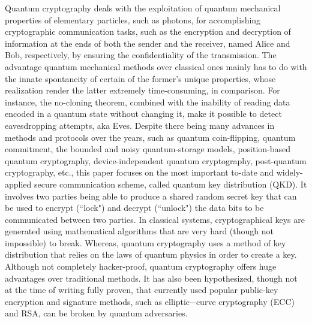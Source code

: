 Quantum cryptography deals with the exploitation of quantum mechanical properties of elementary particles, 
such as photons, for accomplishing cryptographic communication tasks, such as the encryption and decryption of 
information at the ends of both the sender and the receiver, named Alice and Bob, respectively, by ensuring the
confidentiality of the transmission.
The advantage quantum mechanical methods over classical ones mainly has to do with the innate spontaneity of certain 
of the former's unique properties, whose realization render the latter extremely time-consuming, in comparison. 
For instance, the no-cloning theorem, combined with the inability of reading data encoded in a quantum state
without changing it, make it possible to detect eavesdropping attempts, aka Eves.
Despite there being many advances in methods and protocols over the years, such as quantum coin-flipping, 
quantum commitment, the bounded and noisy quantum-storage models, position-based quantum cryptography, device-independent quantum
cryptography, post-quantum cryptography, etc., this paper focuses on the most important to-date and widely-applied secure 
communication scheme, called quantum key distribution (QKD). It involves two parties being able to produce a shared random secret
key that can be used to encrypt (``lock") and decrypt (``unlock") the data bits to be communicated between two parties. 
In classical systems, cryptographical keys are generated using mathematical algorithms that are very hard (though not impossible) to break. 
Whereas, quantum cryptography uses a method of key distribution that relies on the laws of quantum physics in order to create a key. 
Although not completely hacker-proof, quantum cryptography offers huge advantages over traditional methods. 
It has also been hypothesized, though not at the time of writing fully proven, that currently used popular 
public-key encryption and signature methods, such as elliptic−curve cryptography (ECC) and RSA, can be broken 
by quantum adversaries.
